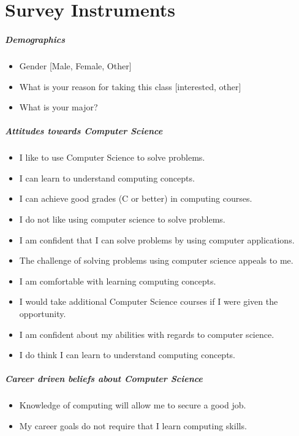 \chapter*{Survey Instruments}
\label{surveyInstrument}

\paragraph * {Demographics}\mbox{} 
\begin{itemize}
\item Gender [Male, Female, Other]
\item What is your reason for taking this class [interested, other]
\item What is your major?
\end{itemize}

\paragraph * {Attitudes towards Computer Science}\mbox{}
\begin{itemize}
\item I like to use Computer Science to solve problems.
\item I can learn to understand computing concepts.
\item I can achieve good grades (C or better) in computing courses.
\item I do not like using computer science to solve problems.
\item I am confident that I can solve problems by using computer applications.
\item The challenge of solving problems using computer science appeals to me.
\item I am comfortable with learning computing concepts.
\item I would take additional Computer Science courses if I were given the opportunity.
\item I am confident about my abilities with regards to computer science.
\item I do think I can learn to understand computing concepts.
\end{itemize}

\paragraph * {Career driven beliefs about Computer Science}\mbox{}
\begin{itemize}
\item Knowledge of computing will allow me to secure a good job.
\item My career goals do not require that I learn computing skills.
\end{itemize}



